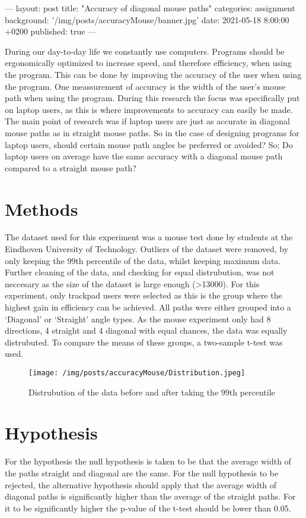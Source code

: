 ---
layout: post
title:  "Accuracy of diagonal mouse paths"
categories: assignment
background: '/img/posts/accuracyMouse/banner.jpg'
date:   2021-05-18 8:00:00 +0200
published: true
---
\usepackage{graphicx}
\usepackage{amsmath}
During our day-to-day life we constantly use computers. Programs should be ergonomically optimized to increase speed, and therefore efficiency, when using the program. This can be done by improving the accuracy of the user when using the program. One meassurement of accuracy is the width of the user's mouse path when using the program. During this research the focus was specifically put on laptop users, as this is where improvements to accuracy can easily be made. The main point of research was if laptop users are just as accurate in diagonal mouse paths as in straight mouse paths. So in the case of designing programs for laptop users, should certain mouse path angles  be preferred or avoided? So; Do laptop users on average have the same accuracy with a diagonal mouse path compared to a straight mouse path? 

\section*{Methods}
The dataset used for this experiment was a mouse test done by students at the Eindhoven University of Technology. Outliers of the dataset were removed, by only keeping the 99th percentile of the data, whilst keeping maximum data. Further cleaning of the data, and checking for equal distrubution, was not neccesary as the size of the dataset is large enough (>13000). For this experiment, only trackpad users were selected as this is the group where the highest gain in efficiency can be achieved. All paths were either grouped into a ‘Diagonal’ or ‘Straight’ angle types. As the mouse experiment only had 8 directions, 4 straight and 4 diagonal with equal chances, the data was equally distrubuted. To compare the means of these groups, a two-sample t-test was used.  

\begin{figure}
    \texttt{[image: /img/posts/accuracyMouse/Distribution.jpeg]}
    \caption{Distrubution of the data before and after taking the 99th percentile}
    \label{fig:dist}
\end{figure}

\section*{Hypothesis}
For the hypothesis the null hypothesis is taken to be that the average width of the paths straight and diagonal are the same. For the null hypothesis to be rejected, the alternative hypothesis should apply that the average width of diagonal paths is significantly higher than the average of the straight paths. For it to be significantly higher the p-value of the t-test should be lower than 0.05.

